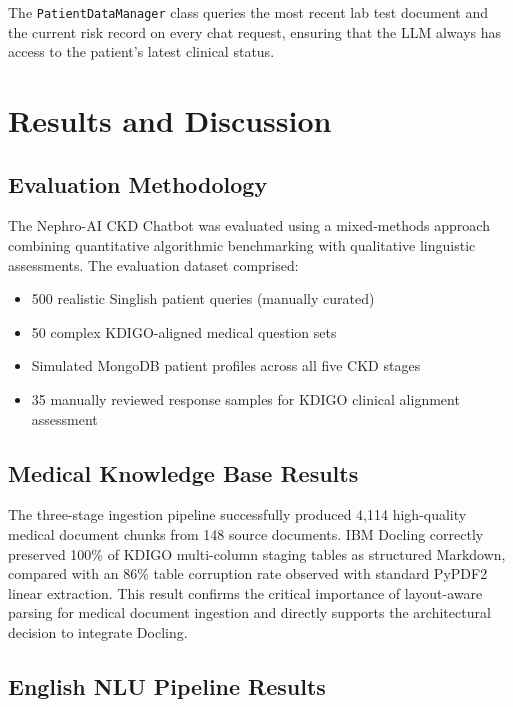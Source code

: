 \documentclass[12pt,a4paper]{report}
\begin{document}
The \texttt{PatientDataManager} class queries the most recent lab test document and the current risk record on every chat request, ensuring that the LLM always has access to the patient's latest clinical status.

\chapter{Results and Discussion}
\label{chap:results}

\section{Evaluation Methodology}

The Nephro-AI CKD Chatbot was evaluated using a mixed-methods approach combining quantitative algorithmic benchmarking with qualitative linguistic assessments. The evaluation dataset comprised:
\begin{itemize}
  \item 500 realistic Singlish patient queries (manually curated)
  \item 50 complex KDIGO-aligned medical question sets
  \item Simulated MongoDB patient profiles across all five CKD stages
  \item 35 manually reviewed response samples for KDIGO clinical alignment assessment
\end{itemize}

\section{Medical Knowledge Base Results}

The three-stage ingestion pipeline successfully produced 4,114 high-quality medical document chunks from 148 source documents. IBM Docling correctly preserved 100\% of KDIGO multi-column staging tables as structured Markdown, compared with an 86\% table corruption rate observed with standard PyPDF2 linear extraction. This result confirms the critical importance of layout-aware parsing for medical document ingestion and directly supports the architectural decision to integrate Docling.

\section{English NLU Pipeline Results}
\end{document}
